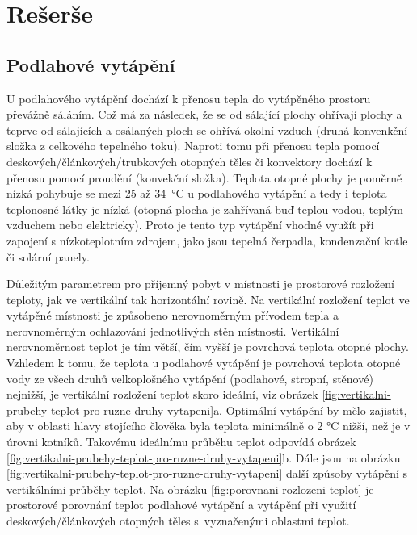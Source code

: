 

\chapter{Rešerše}


\section{Podlahové vytápění}

U podlahového vytápění dochází k přenosu tepla do vytápěného prostoru převážně sáláním. Což má za následek, že se od sálající plochy ohřívají plochy a teprve od sálajících a osálaných ploch se ohřívá okolní vzduch (druhá konvenkční složka z celkového tepelného toku). Naproti tomu při přenosu tepla pomocí deskových/článkových/trubkových otopných těles či konvektory dochází k přenosu pomocí proudění (konvekční složka). 
Teplota otopné plochy je poměrně nízká pohybuje se mezi 25 až 34~°C u podlahového vytápění a tedy i teplota teplonosné látky je nízká (otopná plocha je zahřívaná buď teplou vodou, teplým vzduchem nebo elektricky). Proto je tento typ vytápění vhodné využít při zapojení s nízkoteplotním zdrojem, jako jsou tepelná čerpadla, kondenzační kotle či solární panely.

Důležitým parametrem pro příjemný pobyt v místnosti je prostorové rozložení teploty, jak ve vertikální tak horizontální rovině. Na vertikální rozložení teplot ve vytápěné místnosti je způsobeno nerovnoměrným přívodem tepla a nerovnoměrným ochlazování jednotlivých stěn místnosti. Vertikální nerovnoměrnost teplot je tím větší, čím vyšší je povrchová teplota otopné plochy. Vzhledem k tomu, že teplota u podlahové vytápění je povrchová teplota otopné vody ze všech druhů velkoplošného vytápění (podlahové, stropní, stěnové) nejnižší, je vertikální rozložení teplot skoro ideální, viz obrázek \ref{fig:vertikalni-prubehy-teplot-pro-ruzne-druhy-vytapeni}a. Optimální vytápění by mělo zajistit, aby v oblasti hlavy stojícího člověka byla teplota minimálně o 2 °C nižší, než je v úrovni kotníků. Takovému ideálnímu průběhu teplot odpovídá obrázek \ref{fig:vertikalni-prubehy-teplot-pro-ruzne-druhy-vytapeni}b. Dále jsou na obrázku  \ref{fig:vertikalni-prubehy-teplot-pro-ruzne-druhy-vytapeni} další způsoby vytápění s vertikálními průběhy teplot. Na obrázku \ref{fig:porovnani-rozlozeni-teplot} je prostorové porovnání teplot podlahové vytápění a vytápění při využití deskových/článkových otopných těles s~vyznačenými oblastmi teplot.


